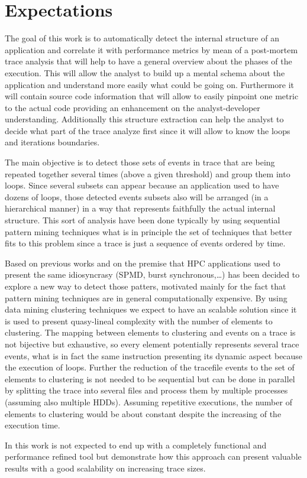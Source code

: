 \section{Expectations}

The goal of this work is to automatically detect the internal structure of an 
application and correlate it with performance metrics by mean of a post-mortem 
trace analysis that will help to have a general overview about the phases of the 
execution. This will allow the analyst to build up a mental schema about the
application and understand more easily what could be going on. Furthermore it will 
contain source code information that will allow to easily pinpoint one metric to 
the actual code providing an enhancement on the analyst-developer
understanding. Additionally this structure extraction can help the analyst to 
decide what part of the trace analyze first since it will allow to know the loops 
and iterations boundaries.

The main objective is to detect those sets of events in trace that are being
repeated together several times (above a given threshold) and group them into 
loops. Since several subsets can appear because an application used to have 
dozens of loops, those detected events subsets also will be arranged (in a 
hierarchical manner) in a way that represents faithfully the actual internal 
structure. This sort of analysis have been done typically by using sequential 
pattern mining techniques what is in principle the set of techniques that better 
fits to this problem since a trace is just a sequence of events ordered by time.

Based on previous works and on the premise that HPC applications used to present
the same idiosyncrasy (SPMD, burst synchronous,\ldots) has been decided to
explore a new way to detect those patters, motivated mainly for the fact that
pattern mining techniques are in general computationally expensive. By using data 
mining clustering techniques we expect to have an scalable
solution since it is used to present quasy-lineal complexity with the number of 
elements to clustering. The mapping between elements to clustering and events on
a trace is not bijective but exhaustive, so every element potentially represents 
several trace events, what is in fact the same instruction presenting its dynamic
aspect because the execution of loops. Further the reduction of the tracefile
events to the set of elements to clustering is not needed to be sequential but 
can be done in parallel by splitting the trace into several files and process
them by multiple processes (assuming also multiple HDDs). Assuming repetitive 
executions, the number of elements to clustering would be about constant despite 
the increasing of the execution time.

In this work is not expected to end up with a completely functional and
performance refined tool but demonstrate how this approach can present valuable 
results with a good scalability on increasing trace sizes.
